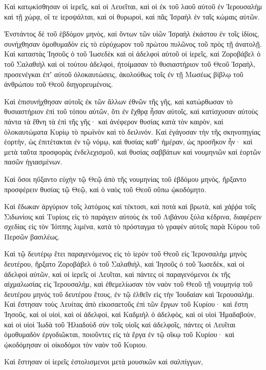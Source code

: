 {Καὶ κατῳκίσθησαν οἱ ἱερεῖς, καὶ οἱ Λευεῖται, καὶ οἱ ἐκ τοῦ λαοῦ αὐτοῦ ἐν Ἱερουσαλὴμ καὶ τῇ χώρᾳ, οἵ τε ἱεροψάλται, καὶ οἱ θυρωροὶ, καὶ πᾶς Ἰσραὴλ ἐν ταῖς κώμαις αὐτῶν.
\par }{\PP {}Ἐνστάντος δὲ τοῦ ἑβδόμον μηνὸς, καὶ ὄντων τῶν υἱῶν Ἰσραὴλ ἑκάστου ἐν τοῖς ἰδίοις, συνήχθησαν ὁμοθυμαδὸν εἰς τὸ εὐρύχωρον τοῦ πρώτου πυλῶνος τοῦ πρὸς τῇ ἀνατολῇ.
Καὶ καταστὰς Ἰησοῦς ὁ τοῦ Ἰωσεδὲκ καὶ οἱ ἀδελφοὶ αὐτοῦ οἱ ἱερεῖς, καὶ Ζοροβάβελ ὁ τοῦ Σαλαθιὴλ καὶ οἱ τούτου ἀδελφοὶ, ἡτοίμασαν τὸ θυσιαστήριον τοῦ Θεοῦ Ἰσραὴλ,
προσενέγκαι ἐπʼ αὐτοῦ ὁλοκαυτώσεις, ἀκολούθως τοῖς ἐν τῇ Μωσέως βίβλῳ τοῦ ἀνθρώπου τοῦ Θεοῦ διηγορευμένοις.
\par }{\PP {}Καὶ ἐπισυνήχθησαν αὐτοῖς ἐκ τῶν ἄλλων ἐθνῶν τῆς γῆς, καὶ κατώρθωσαν τὸ θυσιαστήριον ἐπὶ τοῦ τόπου αὐτῶν, ὅτι ἐν ἔχθρᾳ ἦσαν αὐτοῖς, καὶ κατίσχυσαν αὐτοὺς πάντα τὰ ἔθνη τὰ ἐπὶ τῆς γῆς· καὶ ἀνέφερον θυσίας κατὰ τὸν καιρὸν, καὶ ὁλοκαυτώματα Κυρίῳ τὸ πρωϊνὸν καὶ τὸ δειλινόν.
Καὶ ἐγάγοσαν τὴν τῆς σκηνοπηγίας ἑορτὴν, ὡς ἐπιτέτακται ἐν τῷ νόμῳ, καὶ θυσίας καθʼ ἡμέραν, ὡς προσῆκον ἦν·
καὶ μετὰ ταῦτα προσφορὰς ἐνδελεχισμοῦ, καὶ θυσίας σαββάτων καὶ νουμηνιῶν καὶ ἑορτῶν πασῶν ἡγιασμένων.
\par }{\PP {}Καὶ ὅσοι ηὔξαντο εὐχὴν τῷ Θεῷ ἀπὸ τῆς νουμηνίας τοῦ ἑβδόμου μηνὸς, ἤρξαντο προσφέρειν θυσίας τῷ Θεῷ, καὶ ὁ ναὸς τοῦ Θεοῦ οὔπω ᾠκοδόμητο.
\par }{\PP {}Καὶ ἔδωκαν ἀργύριον τοῖς λατόμοις καὶ τέκτοσι, καὶ ποτὰ καὶ βρωτὰ,
καὶ χάῤῥα τοῖς Σιδωνίοις καὶ Τυρίοις εἰς τὸ παράγειν αὐτοὺς ἐκ τοῦ Λιβάνου ξύλα κέδρινα, διαφέρειν σχεδίας εἰς τὸν Ἰόππης λιμένα, κατὰ τὸ πρόσταγμα τὸ γραφὲν αὐτοῖς παρὰ Κύρου τοῦ Περσῶν βασιλέως.
\par }{\PP {}Καὶ τῷ δευτέρῳ ἔτει παραγενόμενος εἰς τὸ ἰερὸν τοῦ Θεοῦ εἰς Ἱερονσαλὴμ μηνὸς δευτέρου, ἤρξατο Ζοροβάβελ ὁ τοῦ Σαλαθιὴλ, καὶ Ἰησοῦς ὁ τοῦ Ἰωσεδὲκ, καὶ οἱ ἀδελφοὶ αὐτῶν, καὶ οἱ ἱερεῖς οἱ Λευῖται, καὶ πάντες οἱ παραγενόμενοι ἐκ τῆς αἰχμαλωσίας εἰς Ἱερουσαλὴμ,
καὶ ἐθεμελίωσαν τὸν ναὸν τοῦ Θεοῦ τῇ νουμηνίᾳ τοῦ δευτέρου μηνὸς τοῦ δευτέρου ἔτους, ἐν τῷ ἐλθεῖν εἰς τὴν Ἰουδαίαν καὶ Ἱερουσαλήμ.
Καὶ ἔστησαν τοὺς Λευίτας ἀπὸ εἰκοσαετοῦς ἐπὶ τῶν ἔργων τοῦ Κυρίου· καὶ ἔστη Ἰησοῦς, καὶ οἱ υἱοὶ, καὶ οἱ ἀδελφοὶ, καὶ Καδμιὴλ ὁ ἀδελφὸς, καὶ οἱ υἱοὶ Ἠμαδαβοὺν, καὶ οἱ υἱοὶ Ἰωδὰ τοῦ Ἡλιαδοὺδ σὺν τοῖς υἱοῖς καὶ ἀδελφοῖς, πάντες οἱ Λευῖται ὁμοθυμαδὸν ἐργοδιῶκται, ποιοῦντες εἰς τὰ ἔργα ἐν τῷ οἴκῳ τοῦ Κυρίου· καὶ ᾠκοδόμησαν οἱ οἰκοδόμοι τὸν ναὸν τοῦ Κυριου.
\par }{\PP {}Καὶ ἔστησαν οἱ ἱερεῖς ἐστολισμενοι μετὰ μουσικῶν καὶ σαλπίγγων,
}
